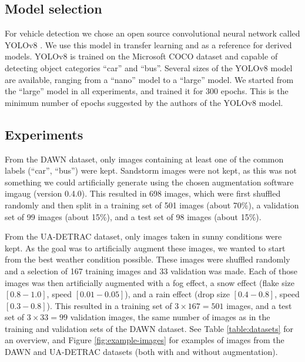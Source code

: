 \documentclass[]{article}
\begin{document}
\subsection{Model selection}
 
	For vehicle detection we chose an open source convolutional neural network called YOLO{\small v8} \cite{yolov8_ultralytics}. We use this model in transfer learning and as a reference for derived models. YOLO{\small v8} is trained on the Microsoft COCO dataset \cite{linMicrosoftCOCOCommon2015a} and capable of detecting object categories ``car'' and ``bus''.  Several sizes of the YOLO{\small v8} model are available, ranging from a ``nano'' model to a ``large'' model.  We started from the ``large'' model in all experiments, and trained it for 300 epochs.  This is the minimum number of epochs suggested by the authors of the YOLO{\small v8} model.

\subsection{Experiments}

	From the DAWN dataset, only images containing at least one of the common labels (``car'', ``bus'') were kept.  Sandstorm images were not kept, as this was not something we could artificially generate using the chosen augmentation software imgaug \cite{imgaug} (version 0.4.0).  This resulted in 698 images, which were first shuffled randomly and then split in a training set of 501 images (about 70\%), a validation set of 99 images (about 15\%), and a test set of 98 images (about 15\%).

	From the UA-DETRAC dataset, only images taken in sunny conditions were kept.  As the goal was to artificially augment these images, we wanted to start from the best weather condition possible.  These images were shuffled randomly and a selection of 167 training images and 33 validation was made.  Each of those images was then artificially augmented with a fog effect, a snow effect (flake size $[0.8 - 1.0]$, speed $[0.01 - 0.05]$), and a rain effect (drop size $[0.4 - 0.8]$, speed $[0.3 - 0.8]$).  This resulted in a training set of $3 \times 167=501$ images, and a test set of $3 \times 33=99$ validation images, the same number of images as in the training and validation sets of the DAWN dataset.  See Table \ref{table:datasets} for an overview, and Figure \ref{fig:example-images} for examples of images from the DAWN and UA-DETRAC datasets (both with and without augmentation).
\end{document}
